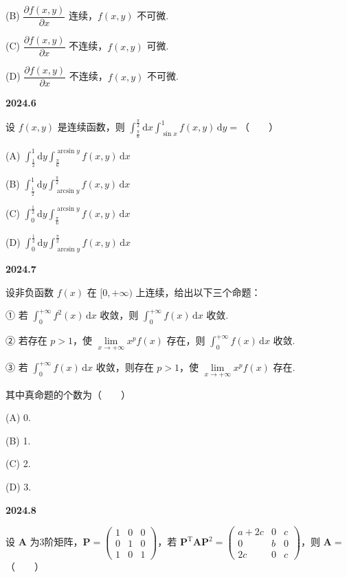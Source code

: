 \documentclass[UTF8,12pt,fontset=windows]{ctexart}
\begin{document}
(B) $\dfrac{\partial f(x,y)}{\partial x}$ 连续，$f(x,y)$ 不可微.

(C) $\dfrac{\partial f(x,y)}{\partial x}$ 不连续，$f(x,y)$ 可微.

(D) $\dfrac{\partial f(x,y)}{\partial x}$ 不连续，$f(x,y)$ 不可微.

\vfill
\newpage
{\large\bfseries 2024.6}

设 $f(x,y)$ 是连续函数，则 $\int_{\frac{\pi}{6}}^{\frac{\pi}{2}}\mathrm{d}x\int_{\sin x}^1 f(x,y)\,\mathrm{d}y=$（　　）

(A) $\int_{\frac12}^1\mathrm{d}y\int_{\frac{\pi}{6}}^{\arcsin y}f(x,y)\,\mathrm{d}x$

(B) $\int_{\frac12}^1\mathrm{d}y\int_{\arcsin y}^{\frac{\pi}{2}}f(x,y)\,\mathrm{d}x$

(C) $\int_0^{\frac12}\mathrm{d}y\int_{\frac{\pi}{6}}^{\arcsin y}f(x,y)\,\mathrm{d}x$

(D) $\int_0^{\frac12}\mathrm{d}y\int_{\arcsin y}^{\frac{\pi}{2}}f(x,y)\,\mathrm{d}x$

\vfill
\newpage
{\large\bfseries 2024.7}

设非负函数 $f(x)$ 在 $[0,+\infty)$ 上连续，给出以下三个命题：

① 若 $\int_0^{+\infty}f^2(x)\,\mathrm{d}x$ 收敛，则 $\int_0^{+\infty}f(x)\,\mathrm{d}x$ 收敛.

② 若存在 $p>1$，使 $\lim\limits_{x\to+\infty}x^p f(x)$ 存在，则 $\int_0^{+\infty}f(x)\,\mathrm{d}x$ 收敛.

③ 若 $\int_0^{+\infty}f(x)\,\mathrm{d}x$ 收敛，则存在 $p>1$，使 $\lim\limits_{x\to+\infty}x^p f(x)$ 存在.

其中真命题的个数为（　　）

(A) 0.

(B) 1.

(C) 2.

(D) 3.

\vfill
\newpage
{\large\bfseries 2024.8}

设 $\boldsymbol{A}$ 为3阶矩阵，$\boldsymbol{P}=\begin{pmatrix}1&0&0\\0&1&0\\1&0&1\end{pmatrix}$，若 $\boldsymbol{P}^{\mathrm{T}}\boldsymbol{A}\boldsymbol{P}^2=\begin{pmatrix}a+2c&0&c\\0&b&0\\2c&0&c\end{pmatrix}$，则 $\boldsymbol{A}=$（　　）
\end{document}
